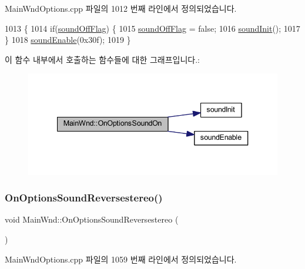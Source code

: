 Main\+Wnd\+Options.\+cpp 파일의 1012 번째 라인에서 정의되었습니다.


\begin{DoxyCode}
1013 \{
1014   \textcolor{keywordflow}{if}(\mbox{\hyperlink{gb_sound_8cpp_a2ff51b8fba1a4efea2d3d72f93210375}{soundOffFlag}}) \{
1015     \mbox{\hyperlink{gb_sound_8cpp_a2ff51b8fba1a4efea2d3d72f93210375}{soundOffFlag}} = \textcolor{keyword}{false};
1016     \mbox{\hyperlink{gb_sound_8cpp_a48aac7ccc2439587be697d3f15fcd2e7}{soundInit}}();
1017   \}
1018   \mbox{\hyperlink{_sound_8cpp_aa3562ee185ac50bb560c6a034475bd18}{soundEnable}}(0x30f);
1019 \}
\end{DoxyCode}
이 함수 내부에서 호출하는 함수들에 대한 그래프입니다.\+:
\nopagebreak
\begin{figure}[H]
\begin{center}
\leavevmode
\includegraphics[width=340pt]{class_main_wnd_a98e970e0bfd8e8bdfd58b5bf6068d75f_cgraph}
\end{center}
\end{figure}
\mbox{\label{class_main_wnd_a17ac28c79cacf19d1f02925b8c8ea6e3}} 
\subsubsection{\texorpdfstring{On\+Options\+Sound\+Reversestereo()}{OnOptionsSoundReversestereo()}}
{\footnotesize\ttfamily void Main\+Wnd\+::\+On\+Options\+Sound\+Reversestereo (\begin{DoxyParamCaption}{ }\end{DoxyParamCaption})\hspace{0.3cm}{\ttfamily [protected]}}



Main\+Wnd\+Options.\+cpp 파일의 1059 번째 라인에서 정의되었습니다.


